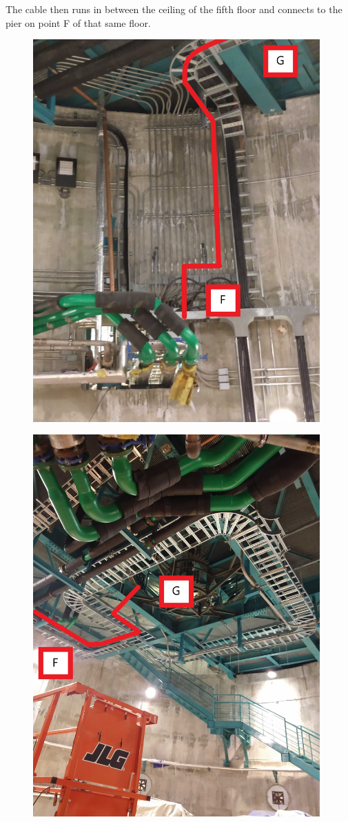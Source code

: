 The cable then runs in between the ceiling of the fifth floor and connects to the pier on point F of that same floor.

\begin{figure}
  \includegraphics[width=11cm]{images/19.jpg}
  \centering
  \label{fig:jlsimon}
\end{figure}

\begin{figure}
  \includegraphics[width=11cm]{images/20.jpg}
  \centering
  \label{fig:jlsimon}
\end{figure}

